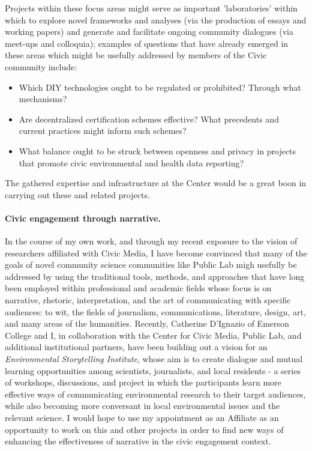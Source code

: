 \documentclass[10pt]{article}
\begin{document}
Projects within these focus areas might serve as important 'laboratories' within which to explore novel frameworks and analyses (via the production of essays and working papers) and generate and facilitate ongoing community dialogues (via meet-ups and colloquia); examples of questions that have already emerged in these areas which might be usefully addressed by members of the Civic community include:

\begin{itemize}
\item Which DIY technologies ought to be regulated or prohibited? Through what mechanisms?
\item Are decentralized certification schemes effective? What precedents and current practices might inform such schemes?
\item What balance ought to be struck between openness and privacy in projects that promote civic environmental and health data reporting? 
\end{itemize}

The gathered expertise and infrastructure at the Center would be a great boon in carrying out these and related projects. 


\paragraph{Civic engagement through narrative.} In the course of my own work, and through my recent exposure to the vision of researchers affiliated with Civic Media, I have become convinced that many of the goals of novel community science communities like Public Lab migh usefully be addressed by using the traditional tools, methods, and approaches that have long been employed within professional and academic fields whose focus is on narrative, rhetoric, interpretation, and the art of communicating with specific audiences:  to wit, the fields of journalism, communications, literature, design, art, and many areas of the humanities.  Recently, Catherine D'Ignazio of Emerson College and I, in collaboration with the Center for Civic Media, Public Lab, and additional institutional partners, have been building out a vision for an \emph{Environmental Storytelling Institute}, whose aim is to create dialogue and mutual learning opportunities among scientists, journalists, and local residents - a series of workshops, discussions, and project in which the participants learn more effective ways of communicating environmental research to their target audiences, while also becoming more conversant in local environmental issues and the relevant science. I would hope to use my appointment as an Affiliate as an opportunity to work on this and other projects in order to find new ways of enhancing the effectiveness of narrative in the civic engagement context. 
\end{document}
